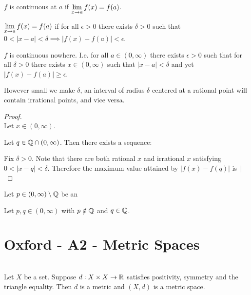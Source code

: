 \begin{definition*}[continuity]
  $f$ is continuous at $a$ if $\LimEq{f(x)}{f(a)}{x}{a}$.
\end{definition*}

\begin{definition*}[limit]
  $\LimEq{f(x)}{f(a)}{x}{a}$ if for all $\epsilon > 0$ there exists $\delta > 0$ such that
  $0 < |x - a| < \delta \implies |f(x) - f(a)| < \epsilon$.
\end{definition*}

\begin{theorem*}
  $f$ is continuous nowhere. I.e. for all $a \in (0, \infty)$ there exists $\epsilon > 0$ such that
  for all $\delta > 0$ there exists $x \in (0, \infty)$ such that $|x - a| < \delta$ and yet
  $|f(x) - f(a)| \geq \epsilon$.
\end{theorem*}

\begin{intuition*}
  However small we make $\delta$, an interval of radius $\delta$ centered at a rational point will
  contain irrational points, and vice versa.
\end{intuition*}

\begin{proof}~\\
  Let $x \in (0, \infty)$.

  Let $q \in \Q \cap (0, \infty)$. Then there exists a sequence:




  Fix $\delta > 0$. Note that there are both rational $x$ and
  irrational $x$ satisfying $0 < |x - q| < \delta$. Therefore the maximum value attained by
  $|f(x) - f(q)|$ is $||$
\end{proof}



Let $p \in (0, \infty) \setminus \Q$ be an

Let $p, q \in (0, \infty)$ with $p \notin \Q$ and $q \in \Q$.


\newpage
\section{Oxford - A2 - Metric Spaces}

\begin{definition}~\\
  Let $X$ be a set. Suppose $d:X \times X \to \R$ satisfies positivity, symmetry and the triangle
  equality. Then $d$ is a metric and $(X, d)$ is a metric space.
\end{definition}


